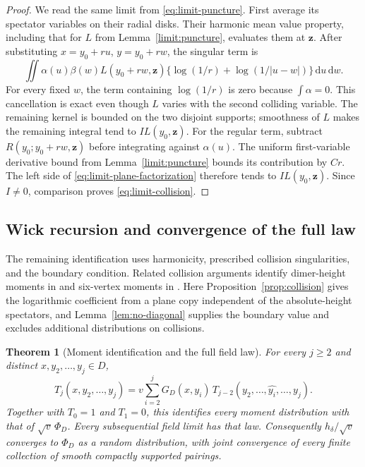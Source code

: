 \documentclass[11pt]{article}
\newtheorem{theorem}{Theorem}[section]
\theoremstyle{definition}
\theoremstyle{remark}
\numberwithin{equation}{section}
\begin{document}
\begin{proof}
We read the same limit from \eqref{eq:limit-puncture}.
First average its spectator variables on their radial disks.
Their harmonic mean value property, including that for \(L\)
from Lemma~\ref{limit:puncture}, evaluates them at \(\mathbf z\).
After substituting \(x=y_0+ru\), \(y=y_0+rw\), the singular term is
\[
 \iint\alpha(u)\beta(w)L(y_0+rw,\mathbf z)
       \{\log(1/r)+\log(1/|u-w|)\}\,\mathrm d u\,\mathrm d w .
\]
For every fixed \(w\), the term containing \(\log(1/r)\) is zero
because \(\int\alpha=0\).  This cancellation is exact even though
\(L\) varies with the second colliding variable.
The remaining kernel is bounded on the two disjoint supports;
smoothness of \(L\) makes the remaining integral tend to
\(I L(y_0,\mathbf z)\).
For the regular term, subtract
\(R(y_0;y_0+rw,\mathbf z)\) before integrating against \(\alpha(u)\).
The uniform first-variable derivative bound from
Lemma~\ref{limit:puncture} bounds its contribution by \(Cr\).
The left side of \eqref{eq:limit-plane-factorization} therefore
tends to \(I L(y_0,\mathbf z)\).
Since \(I\ne0\), comparison proves \eqref{eq:limit-collision}.
\end{proof}

\subsection{Wick recursion and convergence of the full law}

The remaining identification uses harmonicity, prescribed collision
singularities, and the boundary condition.  Related collision arguments
identify dimer-height moments in \cite[Section~3]{Kenyon2001} and
six-vertex moments in \cite[Section~7.2]{DCKLM2026}.
Here Proposition~\ref{prop:collision} gives the logarithmic coefficient
from a plane copy independent of the absolute-height spectators, and
Lemma~\ref{lem:no-diagonal} supplies the boundary value and excludes
additional distributions on collisions.

\begin{theorem}[Moment identification and the full field law]
\label{thm:wick}
For every \(j\ge2\) and distinct \(x,y_2,\ldots,y_j\in D\),
\begin{equation}
 T_j(x,y_2,\ldots,y_j)
   =v\sum_{i=2}^j G_D(x,y_i)\,
          T_{j-2}(y_2,\ldots,\widehat{y_i},\ldots,y_j).
 \label{eq:limit-wick}
\end{equation}
Together with \(T_0=1\) and \(T_1=0\), this identifies every moment
distribution with that of \(\sqrt v\,\Phi_D\).
Every subsequential field limit has that law.  Consequently
\(h_\delta/\sqrt v\) converges to \(\Phi_D\) as a random
distribution, with joint convergence of every finite collection of
smooth compactly supported pairings.
\end{theorem}
\end{document}
